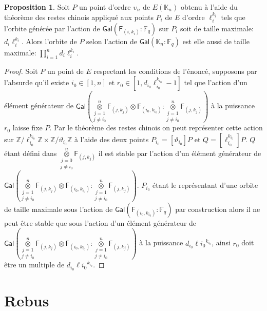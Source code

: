 \documentclass[10pt,a4paper]{book}
\theoremstyle{plain}
\theoremstyle{definition}
\theoremstyle{definition}
\theoremstyle{definition}
\newtheorem{prop}[thm]{Proposition}
\theoremstyle{definition}
\theoremstyle{remark}
\theoremstyle{remark}
\theoremstyle{definition}
\begin{document}
\begin{prop}
\label{pro:rep:com:app}
Soit $P$ un point d'ordre $\upsilon_n$ de $E(\mathbb{K}_n)$ obtenu à l'aide 
du théorème des restes chinois appliqué aux points $P_i$ de $E$ d'ordre 
$\ell_i^{k_i}$ tels que l'orbite générée par l'action de 
$\mathsf{Gal}(\mathsf{F}_{(i,k_i)}:\mathbb{F}_q)$ sur $P_i$ soit de taille
 maximale: $d_i\ell_i^{k_i}$.  Alors l'orbite de $P$ selon l'action de 
 $\mathsf{Gal}(\mathbb{K}_n:\mathbb{F}_q)$ est elle aussi de taille maximale:
 $\prod_{i=1}^nd_i\ell_i^{k_i}$.
\end{prop} 

\begin{proof} 
Soit $P$ un point de $E$ respectant les conditions de l'énoncé, supposons par 
l'absurde qu'il existe $i_0 \in [1,n]$ et $r_0 \in [1,d_{i_0}\ell_{i_0}^{k_{i_0}}-1]$ 
tel que l'action d'un élément générateur de 
$\mathsf{Gal}(\overset{n}{\underset{j \neq i_0}{\underset{j = 1}{\otimes}}}\mathsf{F}_{(j,k_j)}\otimes \mathsf{F}_{(i_0,k_{i_0})}:\overset{n}{\underset{j \neq i_0}{\underset{j = 1}{\otimes}}}\mathsf{F}_{(j,k_j)})$ 
à la puissance $r_0$ laisse fixe $P$. Par le théorème des restes chinois on 
peut représenter cette action sur $\mathbb{Z}/\ell_{i_0}^{k_{i_0}}\mathbb{Z} 
\times \mathbb{Z}/\vartheta_{i_0}\mathbb{Z}$
à l'aide des deux points $P_{i_0}=[\vartheta_{i_0}]P$  et 
$Q=[\ell_{i_0}^{k_{i_0}}]P$. $Q$ étant défini dans 
$\overset{n}{\underset{j \neq i_0}{\underset{j = 0}{\otimes}}} \mathsf{F}_{(j,k_j)}$ 
il est stable par l'action d'un élément générateur de 
$\mathsf{Gal}(\overset{n}{\underset{j \neq i_0}{\underset{j = 1}{\otimes}}}\mathsf{F}_{(j,k_j)}\otimes \mathsf{F}_{(i_0,k_{i_0})}:\overset{n}{\underset{j \neq i_0}{\underset{j = 1}{\otimes}}}\mathsf{F}_{(j,k_j)})$.
$P_{i_0}$ étant le représentant d'une orbite de taille maximale
sous l'action de $\mathsf{Gal}(\mathsf{F}_{(i_0,k_{i_0})}:\mathbb{F}_q)$ par 
construction alors il ne peut être stable que sous l'action d'un élément 
générateur de 
$\mathsf{Gal}(\overset{n}{\underset{j \neq i_0}{\underset{j = 1}{\otimes}}}\mathsf{F}_{(j,k_j)}\otimes \mathsf{F}_{(i_0,k_{i_0})}:\overset{n}{\underset{j \neq i_0}{\underset{j = 1}{\otimes}}}\mathsf{F}_{(j,k_j)})$
à la puissance $d_{i_0}\ell{i_0}^{k_{i_0}}$, ainsi $r_0$ doit être un multiple 
de $d_{i_0}\ell{i_0}^{k_{i_0}}$.
\end{proof}


\printnomenclature
\chapter{Rebus}
\end{document}
